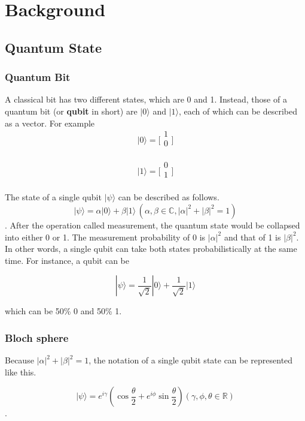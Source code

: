 \chapter{Background}
\label{background}

\section{Quantum State}
\subsection{Quantum Bit}
A classical bit has two different states, which are 0 and 1.   Instead, those of a quantum bit (or \textbf{qubit} in short) are $|0\rangle$ and $|1\rangle$, each of which can be described as a vector. For example  
 $$|0\rangle = \Big[
\begin{array}{c}
1 \\
0 \\
\end{array}
\Big]
$$

$$|1\rangle = \Big[
\begin{array}{c}
0 \\
1 \\
\end{array}
\Big]$$

The state of a single 	qubit $|\psi\rangle$ can be described as follows.
$$ |\psi\rangle = \alpha |0\rangle + \beta |1\rangle \,(\alpha, \beta \in \mathbb{C}, |\alpha|^2+|\beta|^2=1)$$.
 After the operation called measurement, the quantum state would be collapsed into either 0 or 1.  The measurement probability of 0 is $|\alpha|^2$ and that of 1 is $|\beta|^2$. In other words, a single qubit can take both states probabilistically at the same time.  For instance, a qubit can be 
 
 \begin{equation}
	|\psi\rangle = \frac{1}{\sqrt{2}}|0\rangle + \frac{1}{\sqrt{2}}|1\rangle \tag{1}
\end{equation}

 which can be 50\% 0 and 50\% 1.

 \subsection{Bloch sphere}
 Because $|\alpha|^2 + |\beta|^2 = 1$, the notation of a single qubit state can be represented like this.

\begin{equation}
|\psi\rangle = e^{i\gamma} (\cos{\frac{\theta}{2}} + e^{i\phi} \sin{\frac{\theta}{2}}) (\gamma, \phi, \theta \in \mathbb{R})
\end{equation}.

